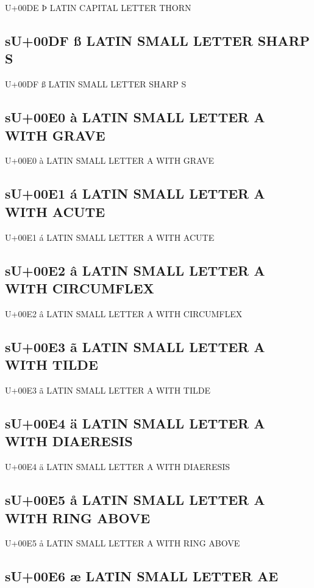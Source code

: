 U+00DE Þ  LATIN CAPITAL LETTER THORN

\subsection{sU+00DF ß  LATIN SMALL LETTER SHARP S}

U+00DF ß  LATIN SMALL LETTER SHARP S

\subsection{sU+00E0 à  LATIN SMALL LETTER A WITH GRAVE}

U+00E0 à  LATIN SMALL LETTER A WITH GRAVE

\subsection{sU+00E1 á  LATIN SMALL LETTER A WITH ACUTE}

U+00E1 á  LATIN SMALL LETTER A WITH ACUTE

\subsection{sU+00E2 â  LATIN SMALL LETTER A WITH CIRCUMFLEX}

U+00E2 â  LATIN SMALL LETTER A WITH CIRCUMFLEX

\subsection{sU+00E3 ã  LATIN SMALL LETTER A WITH TILDE}

U+00E3 ã  LATIN SMALL LETTER A WITH TILDE

\subsection{sU+00E4 ä  LATIN SMALL LETTER A WITH DIAERESIS}

U+00E4 ä  LATIN SMALL LETTER A WITH DIAERESIS

\subsection{sU+00E5 å  LATIN SMALL LETTER A WITH RING ABOVE}

U+00E5 å  LATIN SMALL LETTER A WITH RING ABOVE

\subsection{sU+00E6 æ  LATIN SMALL LETTER AE}

